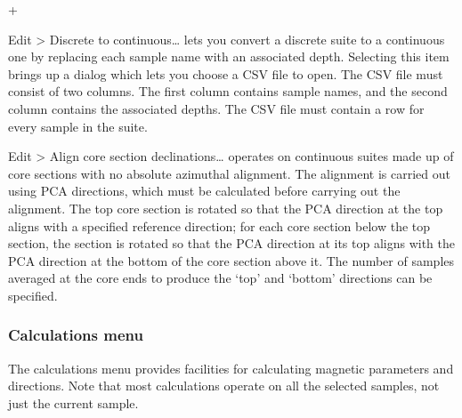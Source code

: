 \documentclass[a4paper,british]{article}
\newcommand{\menuitemlabel}[1]{%
\mbox{\textsf{#1}}\hfil}
\newenvironment{menuitemlist}%
{\begin{list}{}{%
\renewcommand{\makelabel}{\menuitemlabel}%
\setlength{\labelwidth}{35pt}%
\setlength{\leftmargin}%
             {\labelwidth+\labelsep}}}%
{\end{list}}
\newcommand{\submenu}{ \textgreater{} } %
\begin{document}
\begin{menuitemlist}
\item[Edit\submenu Discrete to continuous\ldots] lets you convert a
  discrete suite to a continuous one by replacing each sample name with
  an associated depth. Selecting this item brings up a dialog which lets
  you choose a CSV file to open. The CSV file must consist of two
  columns. The first column contains sample names, and the second column
  contains the associated depths. The CSV file must contain a row for
  every sample in the suite.

\item[Edit\submenu Align core section declinations\ldots] operates on
  continuous suites made up of core sections with no absolute azimuthal
  alignment. The alignment is carried out using PCA directions, which
  must be calculated before carrying out the alignment. The top core
  section is rotated so that the PCA direction at the top aligns with a
  specified reference direction; for each core section below the top
  section, the section is rotated so that the PCA direction at its top
  aligns with the PCA direction at the bottom of the core section above
  it. The number of samples averaged at the core ends to produce the
  `top' and `bottom' directions can be specified.

\end{menuitemlist}

\subsubsection{\label{sec:functions-calcs}Calculations menu}

The calculations menu provides facilities for calculating magnetic
parameters and directions. Note that most calculations operate on
all the selected samples, not just the current sample.
\end{document}
